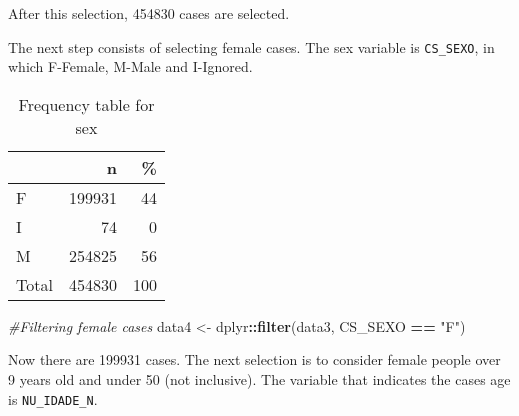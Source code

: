 \documentclass[
]{article}
\newenvironment{Shaded}{\begin{snugshade}}{\end{snugshade}}
\newcommand{\CommentTok}[1]{\textcolor[rgb]{0.56,0.35,0.01}{\textit{#1}}}
\newcommand{\DataTypeTok}[1]{\textcolor[rgb]{0.13,0.29,0.53}{#1}}
\newcommand{\DecValTok}[1]{\textcolor[rgb]{0.00,0.00,0.81}{#1}}
\newcommand{\KeywordTok}[1]{\textcolor[rgb]{0.13,0.29,0.53}{\textbf{#1}}}
\newcommand{\NormalTok}[1]{#1}
\newcommand{\OperatorTok}[1]{\textcolor[rgb]{0.81,0.36,0.00}{\textbf{#1}}}
\newcommand{\OtherTok}[1]{\textcolor[rgb]{0.56,0.35,0.01}{#1}}
\newcommand{\StringTok}[1]{\textcolor[rgb]{0.31,0.60,0.02}{#1}}
\begin{document}
After this selection, 454830 cases are selected.

The next step consists of selecting female cases. The sex variable is
\texttt{CS\_SEXO}, in which F-Female, M-Male and I-Ignored.

\begin{Shaded}
\end{Shaded}

\begin{table}[!h]

\caption{\label{tab:unnamed-chunk-12}Frequency table for sex}
\centering
\begin{tabular}[t]{l|r|r}
\hline
  & n & \%\\
\hline
F & 199931 & 44\\
\hline
I & 74 & 0\\
\hline
M & 254825 & 56\\
\hline
Total & 454830 & 100\\
\hline
\end{tabular}
\end{table}

\begin{Shaded}
\begin{Highlighting}[]
\CommentTok{#Filtering female cases}
\NormalTok{data4 <-}\StringTok{ }\NormalTok{dplyr}\OperatorTok{::}\KeywordTok{filter}\NormalTok{(data3, CS_SEXO }\OperatorTok{==}\StringTok{ "F"}\NormalTok{)}
\end{Highlighting}
\end{Shaded}

Now there are 199931 cases. The next selection is to consider female
people over 9 years old and under 50 (not inclusive). The variable that
indicates the cases age is \texttt{NU\_IDADE\_N}.
\end{document}
